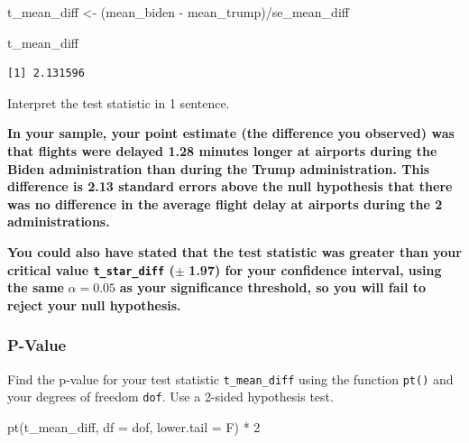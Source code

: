 \documentclass[
  letterpaper,
  DIV=11,
  numbers=noendperiod]{scrartcl}
\newenvironment{Shaded}{\begin{snugshade}}{\end{snugshade}}
\newcommand{\AttributeTok}[1]{\textcolor[rgb]{0.40,0.45,0.13}{#1}}
\newcommand{\DecValTok}[1]{\textcolor[rgb]{0.68,0.00,0.00}{#1}}
\newcommand{\FunctionTok}[1]{\textcolor[rgb]{0.28,0.35,0.67}{#1}}
\newcommand{\NormalTok}[1]{\textcolor[rgb]{0.00,0.23,0.31}{#1}}
\newcommand{\OtherTok}[1]{\textcolor[rgb]{0.00,0.23,0.31}{#1}}
\newcommand{\SpecialCharTok}[1]{\textcolor[rgb]{0.37,0.37,0.37}{#1}}
\begin{document}
\begin{Shaded}
\begin{Highlighting}[]
\NormalTok{t\_mean\_diff }\OtherTok{\textless{}{-}}\NormalTok{ (mean\_biden }\SpecialCharTok{{-}}\NormalTok{ mean\_trump)}\SpecialCharTok{/}\NormalTok{se\_mean\_diff}

\NormalTok{t\_mean\_diff}
\end{Highlighting}
\end{Shaded}

\begin{verbatim}
[1] 2.131596
\end{verbatim}

Interpret the test statistic in 1 sentence.

\begin{tcolorbox}[enhanced jigsaw, colback=white, breakable, arc=.35mm, left=2mm, colframe=quarto-callout-warning-color-frame, opacityback=0, rightrule=.15mm, toprule=.15mm, bottomrule=.15mm, leftrule=.75mm]

\textbf{In your sample, your point estimate (the difference you
observed) was that flights were delayed 1.28 minutes longer at airports
during the Biden administration than during the Trump administration.
This difference is 2.13 standard errors above the null hypothesis that
there was no difference in the average flight delay at airports during
the 2 administrations.}

\textbf{You could also have stated that the test statistic was greater
than your critical value \texttt{t\_star\_diff} (}\(\pm\) \textbf{1.97)
for your confidence interval, using the same} \(\alpha=0.05\) \textbf{as
your significance threshold, so you will fail to reject your null
hypothesis.}

\end{tcolorbox}

\subsubsection{P-Value}\label{p-value-1}

Find the p-value for your test statistic \texttt{t\_mean\_diff} using
the function \texttt{pt()} and your degrees of freedom \texttt{dof}. Use
a 2-sided hypothesis test.

\begin{Shaded}
\begin{Highlighting}[]
\FunctionTok{pt}\NormalTok{(t\_mean\_diff, }
   \AttributeTok{df =}\NormalTok{ dof, }
   \AttributeTok{lower.tail =}\NormalTok{ F) }\SpecialCharTok{*} \DecValTok{2}
\end{Highlighting}
\end{Shaded}
\end{document}
